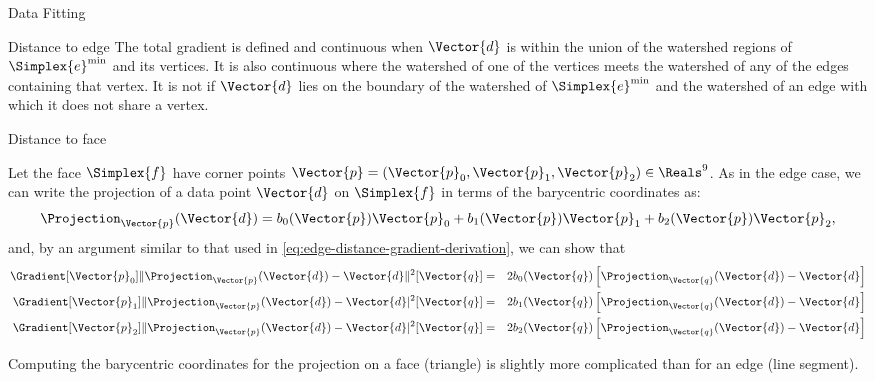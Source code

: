 \begin{plSection}{Data Fitting}
\begin{plSection}{Distance to edge}
The total gradient is defined and continuous
when $\Vector{d}$ is within the union of the watershed regions
of $\Simplex{e}^{\min}$ and its vertices.
It is also continuous where the watershed of one of the vertices
meets the watershed of any of the edges containing that vertex.
It is not if $\Vector{d}$ lies on the boundary of the
watershed of $\Simplex{e}^{\min}$ and the watershed of an
edge with which it does not share a vertex.

\end{plSection}%
\begin{plSection}{Distance to face}
\label{sec:Distance-to-face}

Let the face $\Simplex{f}$ have corner points 
$\Vector{p} = (\Vector{p}_0, \Vector{p}_1, \Vector{p}_2) \in \Reals^9$.
As in the edge case,
we can write the projection of a data point $\Vector{d}$ on $\Simplex{f}$
in terms of the barycentric coordinates as:
\begin{equation}
\Projection_{\Vector{p}} (\Vector{d}) = 
b_0(\Vector{p}) \Vector{p}_0 + b_1(\Vector{p}) \Vector{p}_1 
+ b_2(\Vector{p}) \Vector{p}_2,
\end{equation}
and, by an argument similar to that used in
\cref{eq:edge-distance-gradient-derivation},
we can show that
\begin{eqnarray}
\label{eq:face-distance-gradient}
\Gradient[\Vector{p}_0]
{\|\Projection_{\Vector{p}} (\Vector{d})-\Vector{d}\|^2 }
[\Vector{q}]
& = & 2 b_0(\Vector{q}) 
\left[ \Projection_{\Vector{q}} (\Vector{d})-\Vector{d} \right]
\\
\Gradient[\Vector{p}_1]
{\|\Projection_{\Vector{p}} (\Vector{d})-\Vector{d}|^2 }
[\Vector{q}]
& = & 2 b_1(\Vector{q}) 
\left[ \Projection_{\Vector{q}} (\Vector{d})-\Vector{d} \right]
\nonumber
\\
\Gradient[\Vector{p}_2]
{\|\Projection_{\Vector{p}} (\Vector{d})-\Vector{d}|^2 }
[\Vector{q}]
& = & 2 b_2(\Vector{q}) 
\left[ \Projection_{\Vector{q}} (\Vector{d})-\Vector{d} \right]
\nonumber
\end{eqnarray}

Computing the barycentric coordinates for the projection
on a face (triangle) is slightly more complicated than
for an edge (line segment).


\end{plSection}
\end{plSection}
